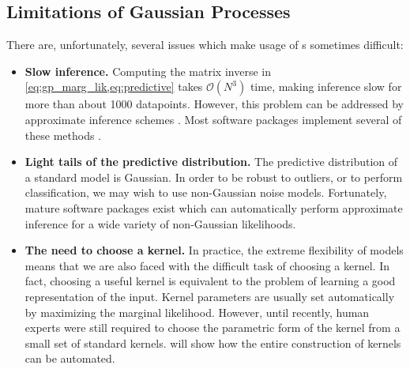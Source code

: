 \subsection{Limitations of Gaussian Processes}

There are, unfortunately, several issues which make usage of \gp{}s sometimes difficult:

\begin{itemize}

\item {\bf Slow inference.}
Computing the matrix inverse in \cref{eq:gp_marg_lik,eq:predictive} takes $\mathcal{O}(N^3)$ time, making inference slow for more than about 1000 datapoints.
However, this problem can be addressed by approximate inference schemes \citep{snelson2006sparse, quinonero2005unifying, hensman2013gaussian}.  Most \gp{} software packages implement several of these methods \citep{GPML, VanRiiHarJylVeh14}.

\item {\bf Light tails of the predictive distribution.}
The predictive distribution of a standard \gp{} model is Gaussian.
In order to be robust to outliers, or to perform classification, we may wish to use non-Gaussian noise models.
Fortunately, mature software packages exist which can automatically perform approximate inference for a wide variety of non-Gaussian likelihoods.

\item {\bf The need to choose a kernel.}
In practice, the extreme flexibility of \gp{} models means that we are also faced with the difficult task of choosing a kernel.
In fact, 
choosing a useful kernel is equivalent to the problem of learning a good representation of the input.
Kernel parameters are usually set automatically by maximizing the marginal likelihood.
However, until recently, human experts were still required to choose the parametric form of the kernel from a small set of standard kernels.
 will show how the entire construction of kernels can be automated.
\end{itemize}





